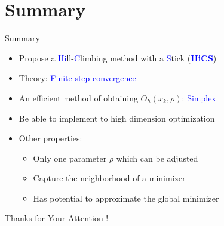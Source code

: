 \documentclass{beamer}
\begin{document}
\section{Summary}
\begin{frame}{Summary}
	\begin{itemize}
		\item Propose a
\textcolor{blue}{Hi}ll-\textcolor{blue}{C}limbing
	method with a \textcolor{blue}{S}tick (\textcolor{blue}{\textbf{HiCS}})
		\item Theory: \textcolor{blue}{Finite-step convergence} 
		\item An efficient method of obtaining $O_h(x_k, \rho)$: \textcolor{blue}{Simplex	}
		\item Be able to implement to high dimension optimization
		\item Other properties:
			\begin{itemize}
				\item Only one parameter $\rho$ which can be adjusted
				\item Capture the neighborhood of a minimizer
				\item Has potential to approximate the global minimizer
			\end{itemize}
	\end{itemize}
\end{frame}

\begin{frame}
	\begin{centering}
	  \Huge Thanks for Your Attention ! \par
	\end{centering}
\end{frame}

%
\end{document}
